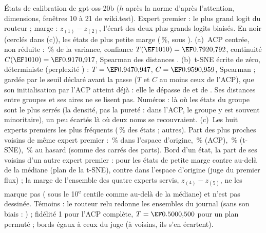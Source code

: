 {États de calibration de gpt-oss-20b ($h$ après la norme d'après l'attention, \LatDim{} dimensions, fenêtres 10 à 21
de wiki.test). Expert premier : le plus grand logit du routeur ; marge : $z_{(1)}-z_{(2)}$, l'écart des deux plus
grands logits biaisés. En noir (cerclés dans (c)), les \LatFragiles{} états de plus petite marge (\LatMargeQuantile\,\%, sous
\LatMargeDouzeDix). (a)~ACP centrée, non réduite : \LatAcpVarPlan\,\% de la variance, confiance $T(\LatK)=\LatAcpT$,
continuité $C(\LatK)=\LatAcpC$, Spearman des distances \LatAcpRho. (b)~t-SNE écrite de zéro, déterministe (perplexité
\LatTsnePerplexite) : $T=\LatTsneT$, $C=\LatTsneC$, Spearman \LatTsneRho{} ; gardée par le seuil déclaré avant la
passe ($T$ et $C$ au moins ceux de l'ACP), que son initialisation par l'ACP atteint déjà : elle le dépasse de
\LatTsneGainT{} et de \LatTsneGainC. Ses distances entre groupes et ses aires ne se lisent pas. Numéros : là où les
états du groupe sont le plus serrés (la densité, pas la pureté : dans l'ACP, le groupe y est souvent minoritaire), un
peu écartés là où deux noms se recouvraient. (c)~Les huit experts premiers les plus fréquents (\LatGroupesPart\,\% des états ;
\LatAutresExperts{} autres). Part des \LatK{} plus proches voisins de même expert premier : \LatAccordHaut\,\% dans
l'espace d'origine, \LatAcpAccord\,\% (ACP), \LatTsneAccord\,\% (t-SNE), \LatAccordHasard\,\% au hasard (somme des
carrés des parts). Bord d'un état, la part de ses \LatKBord{} voisins d'un autre expert premier : \LatBordFragile{}
pour les états de petite marge contre \LatBordLarge{} au-delà de la médiane (plan de la t-SNE), \LatBordOrigFragile{}
contre \LatBordOrigLarge{} dans l'espace d'origine (juge du premier flux) ; la marge de l'ensemble des quatre experts
servis, $z_{(4)}-z_{(5)}$, ne les marque pas (\LatBordQuatreCinq{} sous le 10\textsuperscript{e} centile comme \LatBordQuatreCinqLarge{} au-delà de la médiane) et n'est pas dessinée. Témoins : le routeur relu
redonne les \LatWzeroEnsembles{} ensembles du journal (sans son biais : \LatWzeroCassure) ; fidélité 1 pour l'ACP
complète, $T=\LatTemoinPermuteT$ pour un plan permuté ; bords égaux à ceux du juge (à \LatKBordCasse{} voisins, ils
s'en écartent).}

